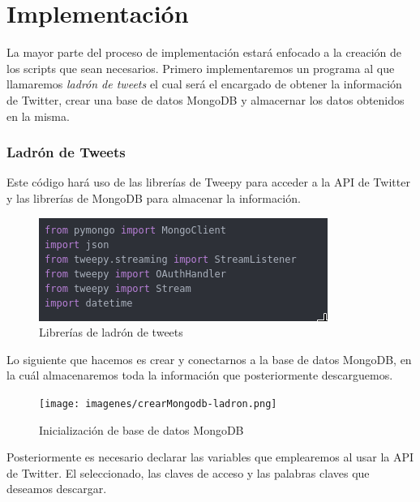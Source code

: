 
\chapter{Implementación}

La mayor parte del proceso de implementación estará enfocado a la creación de los scripts que sean necesarios. Primero implementaremos un programa al que llamaremos \textit{ladrón de tweets} el cual será el encargado de obtener la información de Twitter, crear una base de datos MongoDB y almacernar los datos obtenidos en la misma. 


\subsection{Ladrón de Tweets}

Este código hará uso de las librerías de Tweepy para acceder a la API de Twitter y las librerías de MongoDB para almacenar la información.

\begin{figure}[h]
	\centering
	\includegraphics[scale=.6]{imagenes/include-ladron.png}
	\caption{Librerías de ladrón de tweets}
	\label{fig:include-ladron}
\end{figure}


Lo siguiente que hacemos es crear y conectarnos a la base de datos MongoDB, en la cuál almacenaremos toda la información que posteriormente descarguemos. 

\begin{figure}[h]
	\centering
	\texttt{[image: imagenes/crearMongodb-ladron.png]}
	\caption{Inicialización de base de datos MongoDB}
	\label{fig:crear-mongodb}
\end{figure}


Posteriormente es necesario declarar las variables que emplearemos al usar la API de Twitter. El seleccionado, las claves de acceso y las palabras claves que deseamos descargar. 

